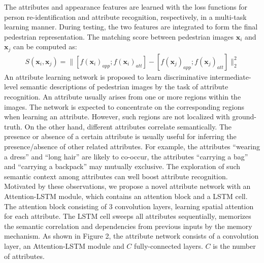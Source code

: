 \documentclass[sigconf]{acmart}
\begin{document}
The attributes and appearance features are learned with the loss functions for person re-identification and attribute recognition, respectively, in a multi-task learning manner. During testing, the two features are integrated to form the final pedestrian representation. The matching score between pedestrian images $\boldsymbol{x}_i$ and $\boldsymbol{x}_j$ can be computed as:
\begin{equation}
\begin{split}
S(\boldsymbol{x}_i,\boldsymbol{x}_j) = \big\|[f(\boldsymbol{x}_i)_{app};f(\boldsymbol{x}_i)_{att}]-[f(\boldsymbol{x}_j)_{app};f(\boldsymbol{x}_j)_{att}]\big\|^2_2
\end{split}
\end{equation}%
An attribute learning network is proposed to learn discriminative intermediate-level semantic descriptions of pedestrian images by the task of attribute recognition. An attribute usually arises from one or more regions within the images. The network is expected to concentrate on the corresponding regions when learning an attribute. However, such regions are not localized with ground-truth. On the other hand, different attributes correlate semantically. The presence or absence of a certain attribute is usually useful for inferring the presence/absence of other related attributes. For example, the attributes ``wearing a dress'' and ``long hair'' are likely to co-occur, the attributes ``carrying a bag'' and ``carrying a backpack'' may mutually exclusive. The exploration of such semantic context among attributes can well boost attribute recognition. Motivated by these observations, we propose a novel attribute network with an Attention-LSTM module, which contains an attention block and a LSTM cell. The attention block consisting of 3 convolution layers, learning spatial attention for each attribute. The LSTM cell sweeps all attributes sequentially, memorizes the semantic correlation and dependencies from previous inputs by the memory mechanism. As shown in Figure 2, the attribute network consists of a convolution layer, an Attention-LSTM module and $C$ fully-connected layers. $C$ is the number of attributes.
\end{document}
